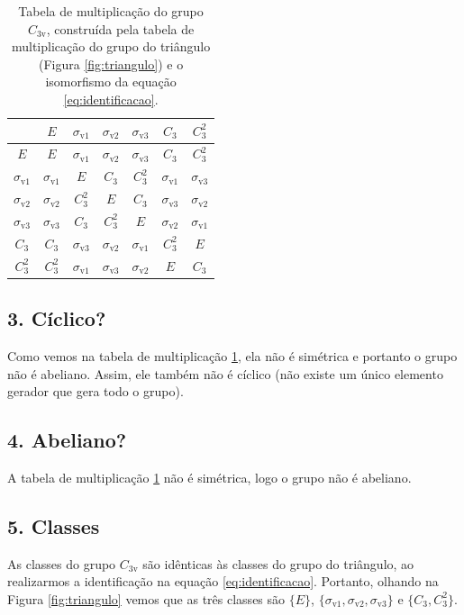 \documentclass[a4paper,10pt]{article}
\begin{document}
\begin{table}[ht]
\caption{Tabela de multiplicação do grupo $C_{3\text{v}}$, construída pela tabela de multiplicação do grupo do triângulo (Figura \ref{fig:triangulo}) e o isomorfismo da equação \ref{eq:identificacao}.}
\centering
\begin{tabular}{ |c|c c c c c c| }
\hline
\phantom{x}          & $E$                  & $\sigma_{\text{v}1}$   & $\sigma_{\text{v}2}$ & $\sigma_{\text{v}3}$ & $C_3$                & $C_3^2$ \\
\hline
$E$                  & $E$                  & $\sigma_{\text{v}1}$   & $\sigma_{\text{v}2}$ & $\sigma_{\text{v}3}$ & $C_3$                & $C_3^2$ \\
$\sigma_{\text{v}1}$ & $\sigma_{\text{v}1}$ & $E$                    & $C_3$                & $C_3^2$              & $\sigma_{\text{v}1}$ & $\sigma_{\text{v}3}$ \\
$\sigma_{\text{v}2}$ & $\sigma_{\text{v}2}$ & $C_3^2$                & $E$                  & $C_3$                & $\sigma_{\text{v}3}$ & $\sigma_{\text{v}2}$ \\
$\sigma_{\text{v}3}$ & $\sigma_{\text{v}3}$ & $C_3$                  & $C_3^2$              & $E$                  & $\sigma_{\text{v}2}$ & $\sigma_{\text{v}1}$ \\
$C_3$                & $C_3$                & $\sigma_{\text{v}3}$   & $\sigma_{\text{v}2}$ & $\sigma_{\text{v}1}$ & $C_3^2$              & $E$ \\
$C_3^2$              & $C_3^2$              & $\sigma_{\text{v}1}$   & $\sigma_{\text{v}3}$ & $\sigma_{\text{v}2}$ & $E$                  & $C_3$ \\
\hline
\end{tabular}
\label{tab:mult}
\end{table}

\subsection*{3. Cíclico?}

Como vemos na tabela de multiplicação \ref{tab:mult}, ela não é simétrica e portanto o grupo não é abeliano. Assim, ele também não é cíclico (não existe um único elemento gerador que gera todo o grupo).

\subsection*{4. Abeliano?}

A tabela de multiplicação \ref{tab:mult} não é simétrica, logo o grupo não é abeliano.

\subsection*{5. Classes}

As classes do grupo $C_{3\text{v}}$ são idênticas às classes do grupo do triângulo, ao realizarmos a identificação na equação \ref{eq:identificacao}. Portanto, olhando na Figura \ref{fig:triangulo} vemos que as três classes são $\{E\}$, $\{\sigma_{\text{v}1}, \sigma_{\text{v}2}, \sigma_{\text{v}3}\}$ e $\{C_3, C_3^2\}$.
\end{document}
